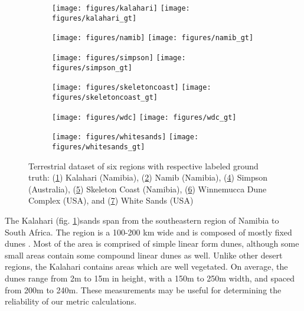 \begin{figure}[H]
	\centering
	\begin{subfigure}{\textwidth}
		\centering
		\texttt{[image: figures/kalahari]}
		\texttt{[image: figures/kalahari\_gt]}
		\caption{}
		\label{fig:kalahari_image}
	\end{subfigure}
	\begin{subfigure}{\textwidth}
		\centering
		\texttt{[image: figures/namib]}
		\texttt{[image: figures/namib\_gt]}
		\caption{}
		\label{fig:namib_image}
	\end{subfigure}
	\begin{subfigure}{\textwidth}
		\centering
		\texttt{[image: figures/simpson]}
		\texttt{[image: figures/simpson\_gt]}
		\caption{}
		\label{fig:simpson_image}
	\end{subfigure}
\end{figure}
\begin{figure}[H]
	\ContinuedFloat
	\centering
	\begin{subfigure}{\textwidth}
		\centering
		\texttt{[image: figures/skeletoncoast]}
		\texttt{[image: figures/skeletoncoast\_gt]}
		\caption{}
		\label{fig:skeleton_coast_image}
	\end{subfigure}
	\begin{subfigure}{\textwidth}
		\centering
		\texttt{[image: figures/wdc]}
		\texttt{[image: figures/wdc\_gt]}
		\caption{}
		\label{fig:wdc_image}
	\end{subfigure}
	\begin{subfigure}{\textwidth}
		\centering
		\texttt{[image: figures/whitesands]}
		\texttt{[image: figures/whitesands\_gt]}
		\caption{}
		\label{fig:white_sands_image}
	\end{subfigure}
	
	\caption{Terrestrial dataset of six regions with respective labeled ground truth: (\ref{fig:kalahari_image}) Kalahari (Namibia), (\ref{fig:namib_image}) Namib (Namibia), (\ref{fig:simpson_image}) Simpson (Australia), (\ref{fig:skeleton_coast_image}) Skeleton Coast (Namibia), (\ref{fig:wdc_image}) Winnemucca Dune Complex (USA), and (\ref{fig:white_sands_image}) White Sands (USA)}
	\label{fig:terrestrial_dataset}
\end{figure}


The Kalahari (fig. \ref{fig:kalahari_image})sands span from the southeastern region of Namibia to South Africa. The region is a 100-200 km wide and is composed of mostly fixed dunes \cite{lancaster_linear_dunes_kalahari}. Most of the area is comprised of simple linear form dunes, although some small areas contain some compound linear dunes as well. Unlike other desert regions, the Kalahari contains areas which are well vegetated. On average, the dunes range from 2m to 15m in height, with a 150m to 250m width, and spaced from 200m to 240m. These measurements may be useful for determining the reliability of our metric calculations.

